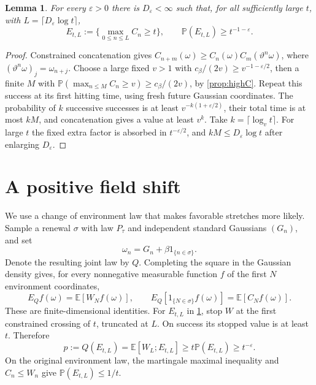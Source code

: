 \documentclass[11pt]{article}
\newtheorem{lemma}[lemma]{Lemma}
\theoremstyle{remark}
\numberwithin{equation}{section}
\newcommand{\E}{\mathbb E}
\newcommand{\Penv}{\mathbb P}
\begin{document}
\begin{lemma}\label{lem:log-window}
For every $\varepsilon>0$ there is $D_\varepsilon<\infty$ such that, for
all sufficiently large $t$, with $L=\lceil D_\varepsilon\log t\rceil$,
\begin{equation}\label{eq:log-window}
 E_{t,L}:=\{\max_{0\le n\le L}C_n\ge t\},\qquad
 \Penv(E_{t,L})\ge t^{-1-\varepsilon}.
\end{equation}
\end{lemma}
\begin{proof}
Constrained concatenation gives
$C_{n+m}(\omega)\ge C_n(\omega)C_m(\vartheta^n\omega)$, where
$(\vartheta^n\omega)_j=\omega_{n+j}$. Choose a large fixed $v>1$ with
$c_\beta/(2v)\ge v^{-1-\varepsilon/2}$, then a finite $M$ with
$\Penv(\max_{n\le M}C_n\ge v)\ge c_\beta/(2v)$, by
\cref{prop:highC}. Repeat this success at its first hitting time, using fresh
future Gaussian coordinates. The probability of $k$ successive successes
is at least $v^{-k(1+\varepsilon/2)}$, their total time is at most $kM$,
and concatenation gives a value at least $v^k$.
Take $k=\lceil\log_v t\rceil$. For large $t$ the fixed extra factor is
absorbed in $t^{-\varepsilon/2}$, and $kM\le D_\varepsilon\log t$ after
enlarging $D_\varepsilon$.
\end{proof}

\section{A positive field shift}\label{sec:field}

We use a change of environment law that makes favorable stretches more
likely. Sample a renewal $\sigma$ with law $P_\tau$ and independent standard
Gaussians $(G_n)$, and set
\[
 \omega_n=G_n+\beta1_{\{n\in\sigma\}}.
\]
Denote the resulting joint law by $Q$. Completing the square in the Gaussian
density gives, for every nonnegative measurable function $f$ of the first
$N$ environment coordinates,
\begin{equation}\label{eq:planting}
 E_Qf(\omega)=\E[W_Nf(\omega)],\qquad
 E_Q[1_{\{N\in\sigma\}}f(\omega)]=\E[C_Nf(\omega)].
\end{equation}
These are finite-dimensional identities. For $E_{t,L}$ in
\cref{lem:log-window}, stop $W$ at the first constrained crossing of $t$,
truncated at $L$. On success its stopped value is at least $t$. Therefore
\begin{equation}\label{eq:planted-success}
 p:=Q(E_{t,L})=\E[W_L;E_{t,L}]
 \ge t\Penv(E_{t,L})\ge t^{-\varepsilon}.
\end{equation}
On the original environment law, the martingale maximal inequality and
$C_n\le W_n$ give $\Penv(E_{t,L})\le1/t$.
\end{document}

